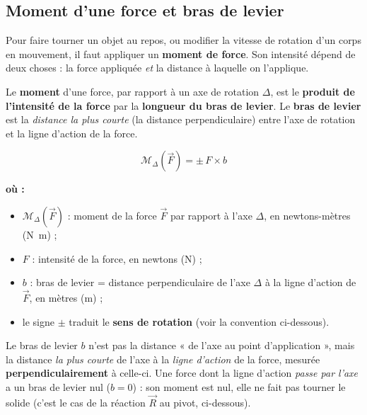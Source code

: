 \documentclass[11pt,a4paper]{article}
\newenvironment{ou}{%
  \par\smallskip\noindent\textbf{où :}\nopagebreak
  \begin{itemize}[leftmargin=1.8em,topsep=2pt,itemsep=1.5pt,parsep=0pt]}%
  {\end{itemize}}
\newcommand{\vv}[1]{\vec{#1}}
\newcommand{\Mom}{\mathcal{M}}      %
\begin{document}
\subsection{Moment d'une force et bras de levier}
Pour faire tourner un objet au repos, ou modifier la vitesse de rotation d'un corps en mouvement,
il faut appliquer un \textbf{moment de force}. Son intensité dépend de deux choses : la force
appliquée \emph{et} la distance à laquelle on l'applique.

\begin{definition}
Le \textbf{moment} d'une force, par rapport à un axe de rotation $\Delta$, est le \textbf{produit de
l'intensité de la force} par la \textbf{longueur du bras de levier}. Le \textbf{bras de levier} est la
\emph{distance la plus courte} (la distance perpendiculaire) entre l'axe de rotation et la ligne
d'action de la force.
\end{definition}

\begin{formule}
\[
\boxed{\;\Mom_{\Delta}(\vv F) = \pm\, F\times b\;}
\]
\begin{ou}
  \item $\Mom_{\Delta}(\vv F)$ : moment de la force $\vv F$ par rapport à l'axe $\Delta$, en newtons-mètres (\si{\newton\metre}) ;
  \item $F$ : intensité de la force, en newtons (\si{\newton}) ;
  \item $b$ : bras de levier = distance perpendiculaire de l'axe $\Delta$ à la ligne d'action de $\vv F$, en mètres (\si{\metre}) ;
  \item le signe $\pm$ traduit le \textbf{sens de rotation} (voir la convention ci-dessous).
\end{ou}
\end{formule}

\begin{attention}
Le bras de levier $b$ n'est pas la distance « de l'axe au point d'application », mais la distance
\emph{la plus courte} de l'axe à la \emph{ligne d'action} de la force, mesurée \textbf{perpendiculairement}
à celle-ci. Une force dont la ligne d'action \emph{passe par l'axe} a un bras de levier nul
($b=0$) : son moment est nul, elle ne fait pas tourner le solide (c'est le cas de la réaction $\vv R$
au pivot, ci-dessous).
\end{attention}
\end{document}
